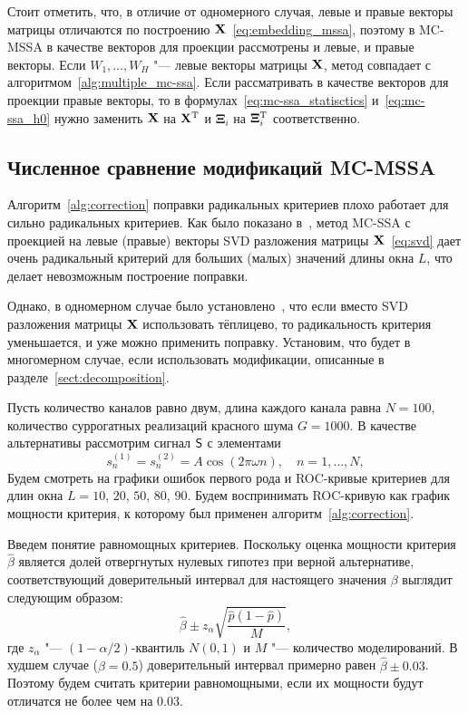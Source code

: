\documentclass[specialist,
substylefile = spbu_report.rtx,
subf,href,colorlinks=true, 12pt]{disser}
\theoremstyle{definition}
\begin{document}
Стоит отметить, что, в отличие от одномерного случая, левые и правые векторы матрицы отличаются по построению $\mathbf{X}$~\eqref{eq:embedding_mssa}, поэтому в MC-MSSA в качестве векторов для проекции рассмотрены и левые, и правые векторы. Если $W_1,\ldots,W_H$ "--- левые векторы матрицы $\mathbf{X}$, метод совпадает с алгоритмом~\ref{alg:multiple_mc-ssa}. Если рассматривать в качестве векторов для проекции правые векторы, то в формулах~\eqref{eq:mc-ssa_statisctics} и~\eqref{eq:mc-ssa_h0} нужно заменить $\mathbf{X}$ на $\mathbf{X}^{\mathrm{T}}$ и $\mathbf{\Xi}_i$ на $\mathbf{\Xi}_i^{\mathrm{T}}$ соответственно.

\subsection{Численное сравнение модификаций MC-MSSA}\label{mc-mssa_numeric_comparison}
Алгоритм~\ref{alg:correction} поправки радикальных критериев плохо работает для сильно радикальных критериев. Как было показано в~\cite[Приложение  Б.2.4]{Larin_2022}, метод MC-SSA с проекцией на левые (правые) векторы SVD разложения матрицы $\mathbf{X}$~\eqref{eq:svd} дает очень радикальный критерий для больших (малых) значений длины окна $L$, что делает невозможным построение поправки.

Однако, в одномерном случае было установлено~\cite{Larin_2022}, что если вместо SVD разложения матрицы $\mathbf{X}$ использовать тёплицево, то радикальность критерия уменьшается, и уже можно применить поправку. Установим, что будет в многомерном случае, если использовать модификации, описанные в разделе~\ref{sect:decomposition}.

Пусть количество каналов равно двум, длина каждого канала равна $N=100$, количество суррогатных реализаций красного шума $G=1000$. В качестве альтернативы рассмотрим сигнал $\mathsf{S}$ с элементами
\[
s_n^{(1)}=s_n^{(2)}=A\cos(2\pi\omega n),\quad n=1,\ldots, N,
\]
Будем смотреть на графики ошибок первого рода и ROC-кривые критериев для длин окна $L=10$, $20$, $50$, $80$, $90$. Будем воспринимать ROC-кривую как график мощности критерия, к которому был применен алгоритм~\ref{alg:correction}.

Введем понятие равномощных критериев. Поскольку оценка мощности критерия $\hat \beta$ является долей отвергнутых нулевых гипотез при верной альтернативе, соответствующий доверительный интервал для настоящего значения $\beta$ выглядит следующим образом:
\[
	\hat \beta \pm z_\alpha \sqrt{\frac{\hat p(1 - \hat p)}M},
\]
где $z_\alpha$ "--- $(1-\alpha/2)$-квантиль $N(0, 1)$ и $M$ "--- количество моделирований. В худшем случае ($\beta=0.5$) доверительный интервал примерно равен $\hat\beta \pm 0.03$. Поэтому будем считать критерии равномощными, если их мощности будут отличатся не более чем на $0.03$.
\end{document}
